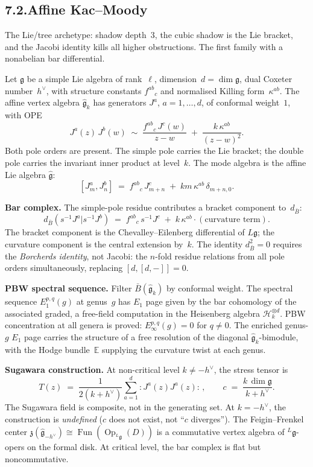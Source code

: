 \documentclass[11pt]{report}
\theoremstyle{definition}
\theoremstyle{remark}
\providecommand{\barB}{\bar{B}}
\providecommand{\fg}{\mathfrak{g}}
\numberwithin{equation}{section}
\begin{document}
\subsection*{7.2.\quad Affine Kac--Moody}

The Lie/tree archetype: shadow
depth~$3$, the cubic shadow is the Lie bracket, and the Jacobi
identity kills all higher obstructions. The first family
with a nonabelian bar differential.

Let $\mathfrak g$ be a simple Lie algebra of rank~$\ell$,
dimension~$d=\dim\mathfrak g$, dual Coxeter number~$h^\vee$,
with structure constants $f^{ab}{}_c$ and normalised Killing
form~$\kappa^{ab}$. The affine vertex algebra
$\widehat{\mathfrak g}_k$ has generators $J^a$,
$a=1,\dots,d$, of conformal weight~$1$, with OPE
\[
J^a(z)\,J^b(w)
\;\sim\;
\frac{f^{ab}{}_c\,J^c(w)}{z-w}
\;+\;
\frac{k\,\kappa^{ab}}{(z-w)^2}.
\]
Both pole orders are present. The simple pole carries the Lie
bracket; the double pole carries the invariant inner product at
level~$k$. The mode algebra is the affine Lie algebra
$\widehat{\mathfrak g}$:
\[
[J^a_m,J^b_n]
\;=\;
f^{ab}{}_c\,J^c_{m+n}
\;+\;
km\,\kappa^{ab}\,\delta_{m+n,0}.
\]

\medskip
\noindent\textbf{Bar complex.}
The simple-pole residue contributes a bracket component
to~$d_{\barB}$:
\[
d_{\barB}(s^{-1}J^a|s^{-1}J^b)
\;=\;
f^{ab}{}_c\,s^{-1}J^c
\;+\;
k\,\kappa^{ab}\cdot(\text{curvature term}).
\]
The bracket component is the Chevalley--Eilenberg differential of
$L\mathfrak g$; the curvature component is the central
extension by~$k$. The identity $d_{\barB}^2=0$ requires the
\emph{Borcherds identity}, not Jacobi: the $n$-fold residue relations from all pole orders
simultaneously, replacing $[d,[d,-]]=0$.

\medskip
\noindent\textbf{PBW spectral sequence.}
Filter $\barB(\widehat{\mathfrak g}_k)$ by conformal weight. The
spectral sequence $E_1^{p,q}(g)$ at genus~$g$ has $E_1$ page given
by the bar cohomology of the associated graded, a free-field
computation in the Heisenberg algebra
$\mathcal H_k^{\otimes d}$. PBW concentration at all genera is
proved: $E_\infty^{p,q}(g)=0$ for $q\neq 0$. The enriched
genus-$g$ $E_1$ page carries the structure of a free resolution of the
diagonal $\widehat{\mathfrak g}_k$-bimodule, with the Hodge
bundle~$\mathbb E$ supplying the curvature twist at each genus.

\medskip
\noindent\textbf{Sugawara construction.}
At non-critical level $k\neq -h^\vee$, the stress tensor is
\[
T(z)
\;=\;
\frac{1}{2(k+h^\vee)}
\sum_{a=1}^{d}{:}J^a(z)J^a(z){:}\,,
\qquad
c
\;=\;
\frac{k\,\dim\mathfrak g}{k+h^\vee}.
\]
The Sugawara field is composite, not in the generating set. At
$k=-h^\vee$, the construction is
\emph{undefined} ($c$ does not exist, not ``$c$ diverges''). The Feigin--Frenkel
center $\mathfrak z(\widehat{\mathfrak g}_{-h^\vee})\cong
\operatorname{Fun}(\operatorname{Op}_{{}^L\fg}(D))$
is a commutative vertex algebra of ${}^L\mathfrak g$-opers on the formal disk. At critical level, the bar
complex is flat but noncommutative.
\end{document}
